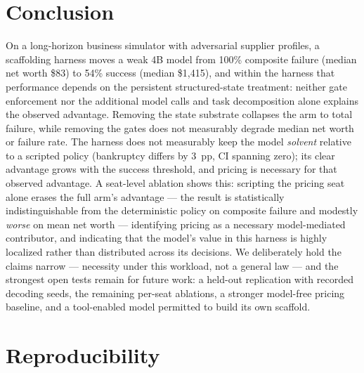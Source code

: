 \documentclass[11pt]{article}
\begin{document}
\section{Conclusion}

On a long-horizon business simulator with adversarial supplier profiles, a
scaffolding harness moves a weak 4B model from 100\% composite failure (median
net worth \$83) to 54\% success (median \$1,415), and within the harness that
performance depends on the persistent structured-state treatment: neither gate
enforcement nor the additional model calls and task decomposition alone explains
the observed advantage. Removing the state substrate collapses the arm to total
failure, while removing the gates does not measurably degrade median net worth
or failure rate. The harness does not measurably keep the model \emph{solvent}
relative to a scripted policy (bankruptcy differs by 3~pp, CI spanning zero);
its clear advantage grows with the success threshold, and pricing is necessary
for that observed advantage. A seat-level ablation shows this: scripting the
pricing seat alone erases the full arm's advantage --- the result is
statistically indistinguishable from the deterministic policy on composite
failure and modestly \emph{worse} on mean net worth --- identifying pricing as a
necessary model-mediated contributor, and indicating that the model's value in
this harness is highly localized rather than distributed across its decisions.
We deliberately hold the claims narrow --- necessity under this workload, not a
general law --- and the strongest open tests remain for future work: a held-out
replication with recorded decoding seeds, the remaining per-seat ablations, a
stronger model-free pricing baseline, and a tool-enabled model permitted to
build its own scaffold.

\appendix

\section{Reproducibility}
\end{document}
